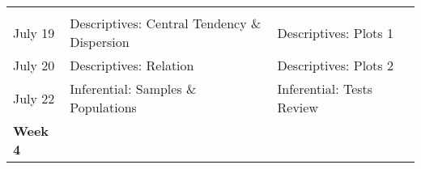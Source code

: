 \documentclass[
]{book}
\begin{document}
\begin{longtable}[]{@{}llll@{}}
\begin{minipage}[t]{0.29\columnwidth}
\strut
\end{minipage} & \begin{minipage}[t]{0.18\columnwidth}\raggedright
\strut
\end{minipage}\tabularnewline
\begin{minipage}[t]{0.09\columnwidth}\raggedright
July 19\strut
\end{minipage} & \begin{minipage}[t]{0.32\columnwidth}\raggedright
Descriptives: Central Tendency \& Dispersion\strut
\end{minipage} & \begin{minipage}[t]{0.29\columnwidth}\raggedright
Descriptives: Plots 1\strut
\end{minipage} & \begin{minipage}[t]{0.18\columnwidth}\raggedright
\strut
\end{minipage}\tabularnewline
\begin{minipage}[t]{0.09\columnwidth}\raggedright
July 20\strut
\end{minipage} & \begin{minipage}[t]{0.32\columnwidth}\raggedright
Descriptives: Relation\strut
\end{minipage} & \begin{minipage}[t]{0.29\columnwidth}\raggedright
Descriptives: Plots 2\strut
\end{minipage} & \begin{minipage}[t]{0.18\columnwidth}\raggedright
\strut
\end{minipage}\tabularnewline
\begin{minipage}[t]{0.09\columnwidth}\raggedright
July 22\strut
\end{minipage} & \begin{minipage}[t]{0.32\columnwidth}\raggedright
Inferential: Samples \& Populations\strut
\end{minipage} & \begin{minipage}[t]{0.29\columnwidth}\raggedright
Inferential: Tests Review\strut
\end{minipage} & \begin{minipage}[t]{0.18\columnwidth}\raggedright
\strut
\end{minipage}\tabularnewline
\begin{minipage}[t]{0.09\columnwidth}\raggedright
\textbf{Week 4}\strut
\end{minipage} & \begin{minipage}[t]{0.32\columnwidth}\raggedright
\strut
\end{minipage} & \begin{minipage}[t]{0.29\columnwidth}\raggedright

\end{minipage}
\end{longtable}
\end{document}
